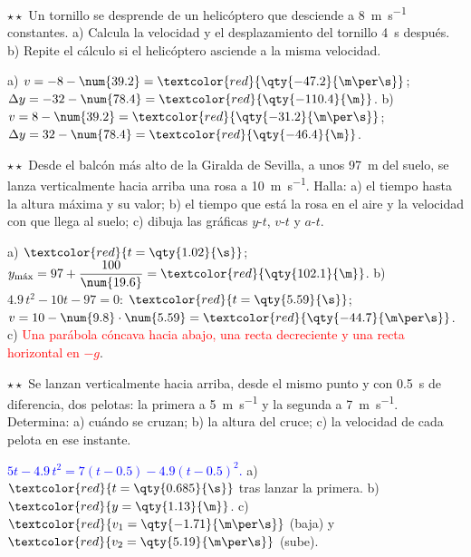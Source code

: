 \begin{exercise}
    \(\star\star\) Un tornillo se desprende de un helicóptero que desciende a \qty{8}{\m\per\s} constantes. a) Calcula la velocidad y
    el desplazamiento del tornillo \qty{4}{\s} después. b) Repite el cálculo si el helicóptero asciende a la misma velocidad.
    \begin{solu}
        a) \(v = -8 - \num{39.2} = \textcolor{red}{\qty{-47.2}{\m\per\s}}\); \(\Delta y = -32 - \num{78.4} = \textcolor{red}{\qty{-110.4}{\m}}\).
        b) \(v = 8 - \num{39.2} = \textcolor{red}{\qty{-31.2}{\m\per\s}}\); \(\Delta y = 32 - \num{78.4} = \textcolor{red}{\qty{-46.4}{\m}}\).
    \end{solu}
\end{exercise}

\begin{exercise}
    \(\star\star\) Desde el balcón más alto de la Giralda de Sevilla, a unos \qty{97}{\m} del suelo, se lanza verticalmente hacia
    arriba una rosa a \qty{10}{\m\per\s}. Halla: a) el tiempo hasta la altura máxima y su valor; b) el tiempo que está la rosa en el
    aire y la velocidad con que llega al suelo; c) dibuja las gráficas \(y\)-\(t\), \(v\)-\(t\) y \(a\)-\(t\).
    \begin{solu}
        a) \(\textcolor{red}{t = \qty{1.02}{\s}}\); \(y_{\text{máx}} = 97 + \dfrac{100}{\num{19.6}} = \textcolor{red}{\qty{102.1}{\m}}\).
        b) \(\num{4.9}\,t^2 - 10t - 97 = 0\): \(\textcolor{red}{t = \qty{5.59}{\s}}\); \(v = 10 - \num{9.8} \cdot \num{5.59} =
        \textcolor{red}{\qty{-44.7}{\m\per\s}}\). c) \textcolor{red}{Una parábola cóncava hacia abajo, una recta decreciente y una
        recta horizontal en \(-g\)}.
    \end{solu}
\end{exercise}

\begin{exercise}
    \(\star\star\) Se lanzan verticalmente hacia arriba, desde el mismo punto y con \qty{0.5}{\s} de diferencia, dos pelotas: la
    primera a \qty{5}{\m\per\s} y la segunda a \qty{7}{\m\per\s}. Determina: a) cuándo se cruzan; b) la altura del cruce; c) la
    velocidad de cada pelota en ese instante.
    \begin{solu}
        \textcolor{blue}{\(5t - \num{4.9}\,t^2 = 7(t - \num{0.5}) - \num{4.9}(t - \num{0.5})^2\).} a) \(\textcolor{red}{t = \qty{0.685}{\s}}\)
        tras lanzar la primera. b) \(\textcolor{red}{y = \qty{1.13}{\m}}\). c) \(\textcolor{red}{v_1 = \qty{-1.71}{\m\per\s}}\) (baja) y
        \(\textcolor{red}{v_2 = \qty{5.19}{\m\per\s}}\) (sube).
    \end{solu}
\end{exercise}

